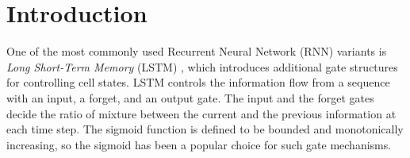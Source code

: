 \documentclass[letterpaper]{article} %
\begin{document}
\section{Introduction}
One of the most commonly used Recurrent Neural Network (RNN) variants is \textit{Long Short-Term Memory} (LSTM) \cite{hochreiter1997long}, which introduces additional gate structures for controlling cell states. LSTM controls the information flow from a sequence with an input, a forget, and an output gate. The input and the forget gates decide the ratio of mixture between the current and the previous information at each time step. 
The sigmoid function is defined to be bounded and monotonically increasing, so the sigmoid has been a popular choice for such gate mechanisms.
\end{document}
